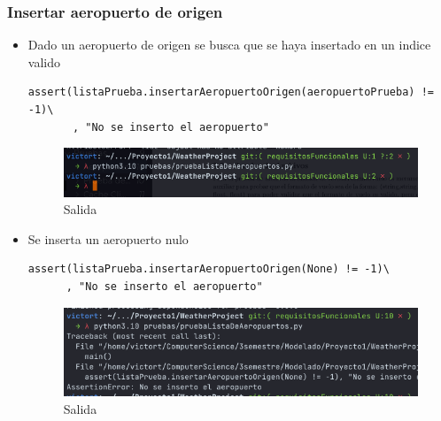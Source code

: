 \documentclass[12pt]{article}
\begin{document}
\subsubsection{Insertar aeropuerto de origen}
\begin{itemize}
\item Dado un aeropuerto de origen se busca que se haya insertado en un indice valido
\begin{verbatim}
assert(listaPrueba.insertarAeropuertoOrigen(aeropuertoPrueba) != -1)\
       , "No se inserto el aeropuerto"
\end{verbatim}
  \newpage
\begin{figure}[h!]
    \centering
    \includegraphics[scale=0.6]{pruebasPy/listaAeropuertos/bien.png}
    \caption{Salida}
  \end{figure}
\item Se inserta un aeropuerto nulo
\begin{verbatim}
assert(listaPrueba.insertarAeropuertoOrigen(None) != -1)\
      , "No se inserto el aeropuerto"
\end{verbatim}
\begin{figure}[h!]
    \centering
    \includegraphics[scale=0.6]{pruebasPy/listaAeropuertos/insertaNone.png}
    \caption{Salida}
  \end{figure}
\end{itemize}
\end{document}

